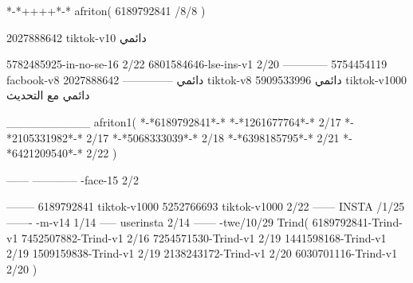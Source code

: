 *-*++++*-*
afriton(
6189792841 /8/8
)

2027888642 tiktok-v10
دائمي

5782485925-in-no-se-16 2/22
6801584646-lse-ins-v1 2/20
------------
5754454119 facbook-v8
دائمي
--------------
2027888642 tiktok-v8
دائمي
5909533996 tiktok-v1000
دائمي مع التحديث

__________
afriton1(
*-*6189792841*-*
*-*1261677764*-* 2/17
*-*2105331982*-* 2/17
*-*5068333039*-* 2/18
*-*6398185795*-* 2/21
*-*6421209540*-* 2/22
)

------
------------
-face-15 2/2

--------
6189792841 tiktok-v1000
5252766693 tiktok-v1000 2/22
------
 INSTA /1/25
-------
-m-v14 1/14
-----
userinsta 2/14
------
-twe/10/29
Trind(
6189792841-Trind-v1 
7452507882-Trind-v1 2/16
7254571530-Trind-v1 2/19
1441598168-Trind-v1 2/19
1509159838-Trind-v1 2/19
2138243172-Trind-v1 2/20
6030701116-Trind-v1 2/20
)
